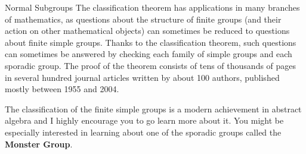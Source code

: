 \begin{section}{Normal Subgroups}
The classification theorem has applications in many branches of mathematics, as questions about the structure of finite groups (and their action on other mathematical objects) can sometimes be reduced to questions about finite simple groups. Thanks to the classification theorem, such questions can sometimes be answered by checking each family of simple groups and each sporadic group.  The proof of the theorem consists of tens of thousands of pages in several hundred journal articles written by about 100 authors, published mostly between 1955 and 2004.

The classification of the finite simple groups is a modern achievement in abstract algebra and I highly encourage you to go learn more about it.  You might be especially interested in learning about one of the sporadic groups called the \textbf{Monster Group}.

\end{section}